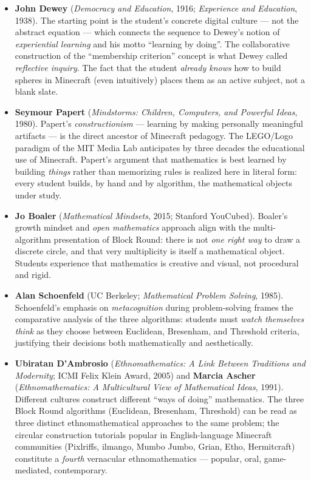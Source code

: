 \documentclass[12pt,a4paper]{scrartcl}
\newcommand{\acc}[1]{\textcolor{accent}{\textbf{#1}}}
\begin{document}
\begin{itemize}[leftmargin=1.3em,itemsep=0.2em,topsep=0.3em]
  \item \acc{John Dewey} (\emph{Democracy and Education}, 1916; \emph{Experience and Education}, 1938). The starting point is the student's concrete digital culture --- not the abstract equation --- which connects the sequence to Dewey's notion of \emph{experiential learning} and his motto \enquote{learning by doing}. The collaborative construction of the \enquote{membership criterion} concept is what Dewey called \emph{reflective inquiry}. The fact that the student \emph{already knows} how to build spheres in Minecraft (even intuitively) places them as an active subject, not a blank slate.

  \item \acc{Seymour Papert} (\emph{Mindstorms: Children, Computers, and Powerful Ideas}, 1980). Papert's \emph{constructionism} --- learning by making personally meaningful artifacts --- is the direct ancestor of Minecraft pedagogy. The LEGO/Logo paradigm of the MIT Media Lab anticipates by three decades the educational use of Minecraft. Papert's argument that mathematics is best learned by building \emph{things} rather than memorizing rules is realized here in literal form: every student builds, by hand and by algorithm, the mathematical objects under study.

  \item \acc{Jo Boaler} (\emph{Mathematical Mindsets}, 2015; Stanford YouCubed). Boaler's growth mindset and \emph{open mathematics} approach align with the multi-algorithm presentation of Block Round: there is not \emph{one right way} to draw a discrete circle, and that very multiplicity is itself a mathematical object. Students experience that mathematics is creative and visual, not procedural and rigid.

  \item \acc{Alan Schoenfeld} (UC Berkeley; \emph{Mathematical Problem Solving}, 1985). Schoenfeld's emphasis on \emph{metacognition} during problem-solving frames the comparative analysis of the three algorithms: students must \emph{watch themselves think} as they choose between Euclidean, Bresenham, and Threshold criteria, justifying their decisions both mathematically and aesthetically.

  \item \acc{Ubiratan D'Ambrosio} (\emph{Ethnomathematics: A Link Between Traditions and Modernity}; ICMI Felix Klein Award, 2005) and \acc{Marcia Ascher} (\emph{Ethnomathematics: A Multicultural View of Mathematical Ideas}, 1991). Different cultures construct different \enquote{ways of doing} mathematics. The three Block Round algorithms (Euclidean, Bresenham, Threshold) can be read as three distinct ethnomathematical approaches to the same problem; the circular construction tutorials popular in English-language Minecraft communities (Pixlriffs, ilmango, Mumbo Jumbo, Grian, Etho, Hermitcraft) constitute a \emph{fourth} vernacular ethnomathematics --- popular, oral, game-mediated, contemporary.


\end{itemize}
\end{document}
